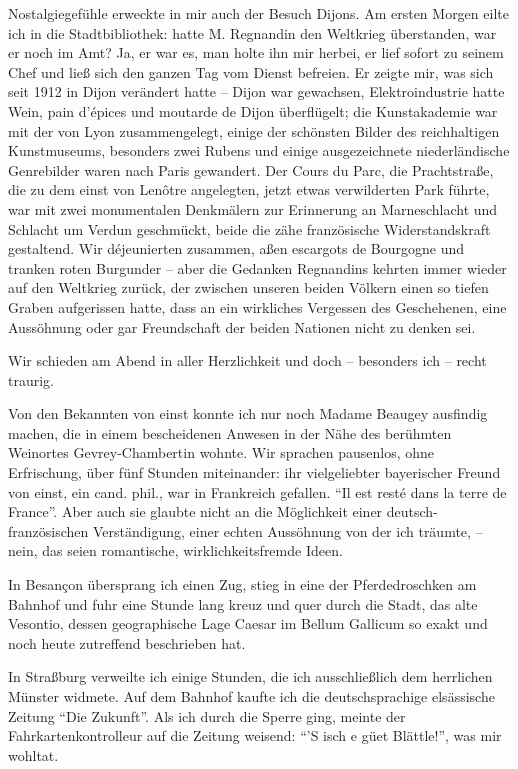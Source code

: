 \documentclass[a5paper,pagesize,10pt,twoside=true]{scrbook}
\begin{document}
Nostalgiegefühle erweckte in mir auch der Besuch Dijons. Am ersten Morgen eilte ich in die Stadtbibliothek: hatte M. Regnandin den Weltkrieg überstanden, war er noch im Amt? Ja, er war es, man holte ihn mir herbei, er lief sofort zu seinem Chef und ließ sich den ganzen Tag vom Dienst befreien. Er zeigte mir, was sich seit 1912 in Dijon verändert hatte -- Dijon war gewachsen, Elektroindustrie hatte Wein, pain d'épices und moutarde de Dijon überflügelt; die Kunstakademie war mit der von Lyon zusammengelegt, einige der schönsten Bilder des reichhaltigen Kunstmuseums, besonders zwei Rubens und einige ausgezeichnete niederländische Genrebilder waren nach Paris gewandert. Der Cours du Parc, die Prachtstraße, die zu dem einst von Lenôtre angelegten, jetzt etwas verwilderten Park führte, war mit zwei monumentalen Denkmälern zur Erinnerung an Marneschlacht und Schlacht um Verdun geschmückt, beide die zähe französische Widerstandskraft gestaltend. Wir déjeunierten zusammen, aßen escargots de Bourgogne und tranken roten Burgunder -- aber die Gedanken Regnandins kehrten immer wieder auf den Weltkrieg zurück, der zwischen unseren beiden Völkern einen so tiefen Graben aufgerissen hatte, dass an ein wirkliches Vergessen des Geschehenen, eine Aussöhnung oder gar Freundschaft der beiden Nationen nicht zu denken sei.

Wir schieden am Abend in aller Herzlichkeit und doch -- besonders ich -- recht traurig.

Von den Bekannten von einst konnte ich nur noch Madame Beaugey ausfindig machen, die in einem bescheidenen Anwesen in der Nähe des berühmten Weinortes Gevrey-Chambertin wohnte. Wir sprachen pausenlos, ohne Erfrischung, über fünf Stunden miteinander: ihr vielgeliebter bayerischer Freund von einst, ein cand. phil., war in Frankreich gefallen. \enquote{Il est resté dans la terre de France}. Aber auch sie glaubte nicht an die Möglichkeit einer deutsch-französischen Verständigung, einer echten Aussöhnung von der ich träumte, -- nein, das seien romantische, wirklichkeitsfremde Ideen.

In Besançon übersprang ich einen Zug, stieg in eine der Pferdedroschken am Bahnhof und fuhr eine Stunde lang kreuz und quer durch die Stadt, das alte Vesontio, dessen geographische Lage Caesar im Bellum Gallicum so exakt und noch heute zutreffend beschrieben hat.

In Straßburg verweilte ich einige Stunden, die ich ausschließlich dem herrlichen Münster widmete. Auf dem Bahnhof kaufte ich die deutschsprachige elsässische Zeitung \enquote{Die Zukunft}. Als ich durch die Sperre ging, meinte der Fahrkartenkontrolleur auf die Zeitung weisend: \enquote{'S isch e güet Blättle!}, was mir wohltat.
\end{document}
